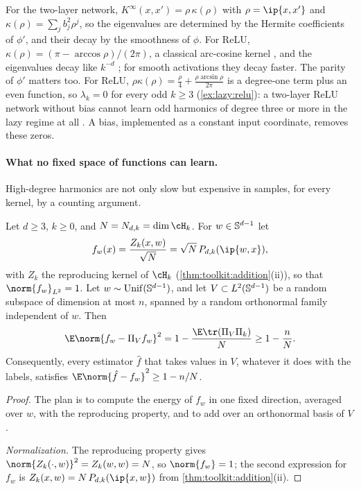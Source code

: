 \begin{refsection}
For the two-layer network, $K^\infty(x,x')=\rho\,\kappa(\rho)$ with $\rho=\ip{x,x'}$ and $\kappa(\rho)=\sum_jb_j^2\rho^j$, so the eigenvalues are determined by the Hermite coefficients of $\phi'$, and their decay by the smoothness of $\phi$. For ReLU, $\kappa(\rho)=(\pi-\arccos\rho)/(2\pi)$, a classical arc-cosine kernel \parencite{ChoSaul2009}, and the eigenvalues decay like $k^{-d}$ \parencite{BiettiMairal2019}; for smooth activations they decay faster. The parity of $\phi'$ matters too. For ReLU, $\rho\kappa(\rho)=\frac\rho4+\frac{\rho\arcsin\rho}{2\pi}$ is a degree-one term plus an even function, so $\lambda_k=0$ for every odd $k\ge3$ (\cref{ex:lazy:relu}): a two-layer ReLU network without bias cannot learn odd harmonics of degree three or more in the lazy regime at all \parencite{BasriEtAl2019}. A bias, implemented as a constant input coordinate, removes these zeros.

\paragraph{What no fixed space of functions can learn.} High-degree harmonics are not only slow but expensive in samples, for every kernel, by a counting argument.

\begin{theorem}\label{thm:lazy:lower}
Let $d\ge3$, $k\ge0$, and $N=N_{d,k}=\dim\cH_k$. For $w\in\mathbb{S}^{d-1}$ let
\[
  f_w(x)=\frac{Z_k(x,w)}{\sqrt N}=\sqrt N\,P_{d,k}(\ip{w,x}),
\]
with $Z_k$ the reproducing kernel of $\cH_k$ (\cref{thm:toolkit:addition}(ii)), so that $\norm{f_w}_{L^2}=1$. Let $w\sim\operatorname{Unif}(\mathbb{S}^{d-1})$, and let $V\subset L^2(\mathbb{S}^{d-1})$ be a random subspace of dimension at most $n$, spanned by a random orthonormal family independent of $w$. Then
\[
  \E\norm{f_w-\Pi_Vf_w}^2=1-\frac{\E\tr(\Pi_V\Pi_k)}N\ge1-\frac nN .
\]
Consequently, every estimator $\hat f$ that takes values in $V$, whatever it does with the labels, satisfies $\E\norm{\hat f-f_w}^2\ge1-n/N$.
\end{theorem}

\begin{proof}
The plan is to compute the energy of $f_w$ in one fixed direction, averaged over $w$, with the reproducing property, and to add over an orthonormal basis of $V$.

\emph{Normalization.} The reproducing property gives $\norm{Z_k(\cdot,w)}^2=Z_k(w,w)=N$, so $\norm{f_w}=1$; the second expression for $f_w$ is $Z_k(x,w)=N\,P_{d,k}(\ip{x,w})$ from \cref{thm:toolkit:addition}(ii).


\end{proof}
\end{refsection}
